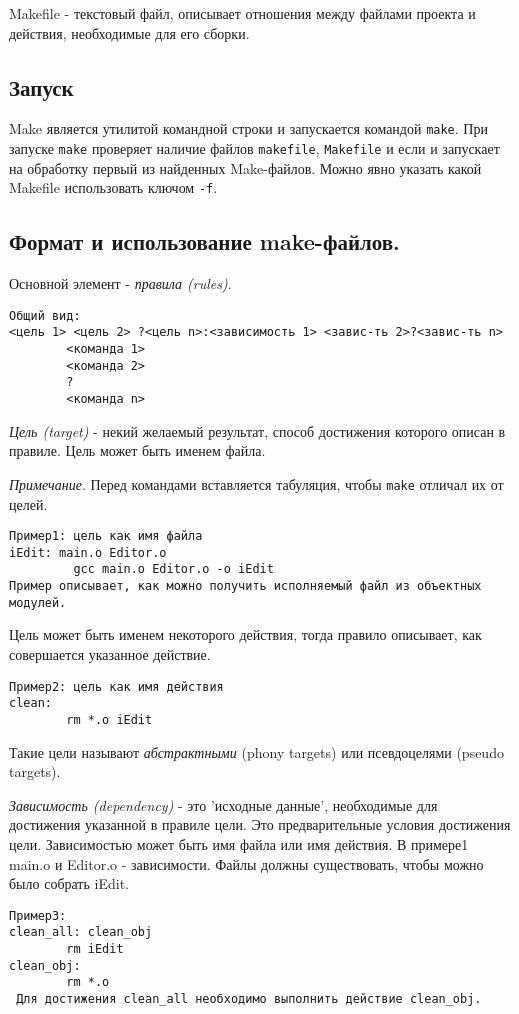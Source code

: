 Makefile - текстовый файл, описывает отношения между файлами проекта и действия, необходимые для его сборки.

\subsection{Запуск}

Make является утилитой командной строки и запускается командой \verb+make+. При запуске \verb+make+ проверяет наличие файлов \verb+makefile+, \verb+Makefile+ и если и запускает на обработку первый из найденных Make-файлов. Можно явно указать какой Makefile использовать ключом \verb+-f+.

\subsection{Формат и использование make-файлов.}

Основной элемент - \emph{правила (rules)}.

\begin{verbatim}
Общий вид:
<цель 1> <цель 2> ?<цель n>:<зависимость 1> <завис-ть 2>?<завис-ть n>
        <команда 1>
        <команда 2>
        ?
        <команда n>
\end{verbatim}

\emph{Цель (target)} - некий желаемый результат, способ достижения которого описан в правиле. Цель может быть именем файла.

\emph{Примечание}. Перед командами вставляется табуляция, чтобы \verb+make+ отличал их от целей.

\begin{verbatim}
Пример1: цель как имя файла
iEdit: main.o Editor.o
         gcc main.o Editor.o -o iEdit
Пример описывает, как можно получить исполняемый файл из объектных модулей.
\end{verbatim}

Цель может быть именем некоторого действия, тогда правило описывает, как совершается указанное действие.
\begin{verbatim}
Пример2: цель как имя действия
clean:
        rm *.o iEdit
\end{verbatim}

Такие цели называют \emph{абстрактными} (phony targets) или псевдоцелями (pseudo targets).

\emph{Зависимость (dependency)} - это 'исходные данные', необходимые для достижения указанной в правиле цели. Это предварительные условия достижения цели. Зависимостью может быть имя файла или имя действия. В примере1 main.o и Editor.o - зависимости. Файлы должны существовать, чтобы можно было собрать iEdit.
\begin{verbatim}
Пример3:
clean_all: clean_obj
        rm iEdit
clean_obj:
        rm *.o
 Для достижения сlean_all необходимо выполнить действие clean_obj.
\end{verbatim}

